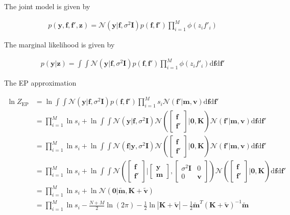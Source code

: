 \documentclass[10pt,a4paper]{article}
\begin{document}
The joint model is given by

\begin{align}
	p(\bm{y}, \bm{f}, \bm{f}', \bm{z}) = \mathcal{N}\left(\bm{y}|\bm{f}, \sigma^2 \bm{I}\right)p(\bm{f}, \bm{f}')\prod_{i=1}^M \phi\left(z_i f'_i\right)
\end{align}

The marginal likelihood is given by

\begin{align}
	p(\bm{y}|\bm{z}) = \int\!\!\!\int \mathcal{N}\left(\bm{y}|\bm{f}, \sigma^2 \bm{I}\right)p(\bm{f}, \bm{f}')\prod_{i=1}^M \phi\left(z_i f'_i\right) \text{d}\bm{f}\text{d}\bm{f'}
\end{align}

The EP approximation

\begin{align}
	\ln Z_{\text{EP}} &= \ln \int\!\!\!\int \mathcal{N}\left(\bm{y}|\bm{f}, \sigma^2 \bm{I}\right)p(\bm{f}, \bm{f}')\prod_{i=1}^M s_i \mathcal{N}\left(\bm{f}'|\bm{m}, \bm{v} \right)\text{d}\bm{f}\text{d}\bm{f'}\\
	&= \prod_{i=1}^M \ln s_i + \ln \int\!\!\!\int \mathcal{N}\left(\bm{y}|\bm{f}, \sigma^2 \bm{I}\right)\mathcal{N}\left(\begin{bmatrix}\bm{f}\\\bm{f}'\end{bmatrix}\big| \bm{0}, \bm{K}\right) \mathcal{N}\left(\bm{f}'|\bm{m}, \bm{v} \right)\text{d}\bm{f}\text{d}\bm{f'}\\
	&= \prod_{i=1}^M \ln s_i + \ln \int\!\!\!\int \mathcal{N}\left(\bm{f}\big|\bm{y}, \sigma^2 \bm{I}\right)\mathcal{N}\left(\begin{bmatrix}\bm{f}\\\bm{f}'\end{bmatrix}\big| \bm{0}, \bm{K}\right) \mathcal{N}\left(\bm{f}'|\bm{m}, \bm{v} \right)\text{d}\bm{f}\text{d}\bm{f'}\\
	&= \prod_{i=1}^M \ln s_i + \ln \int\!\!\!\int \mathcal{N}\left(\begin{bmatrix}\bm{f}\\\bm{f}'\end{bmatrix}\big|\begin{bmatrix}\bm{y}\\\bm{m}\end{bmatrix}, \begin{bmatrix}\sigma^2 \bm{I}&0\\0&\bm{v}\end{bmatrix}\right)\mathcal{N}\left(\begin{bmatrix}\bm{f}\\\bm{f}'\end{bmatrix}\big| \bm{0}, \bm{K}\right) \text{d}\bm{f}\text{d}\bm{f'}\\
	&= \prod_{i=1}^M \ln s_i + \ln \mathcal{N}\left(\bm{0}\big|\tilde{\bm{m}}, \bm{K} + \tilde{\bm{v}}\right)\\
	&= \prod_{i=1}^M \ln s_i - \frac{N+M}{2}\ln\left(2\pi\right) - \frac{1}{2}\ln|\bm{K} + \tilde{\bm{v}}| - \frac12 \tilde{\bm{m}}^T \left(\bm{K} + \tilde{\bm{v}}\right)^{-1} \tilde{\bm{m}}
\end{align}
\end{document}
